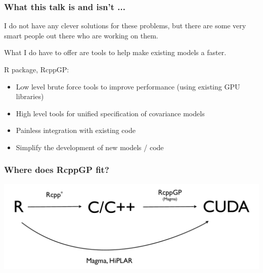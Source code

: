 \documentclass[slidestop,mathserif]{beamer}
\begin{document}
\begin{frame}
\frametitle{What this talk is and isn't ...}

I do not have any clever solutions for these problems, but there are some very smart people out there who are working on them.

\pause\vspace{6mm}

What I do have to offer are tools to help make existing models a faster. 

\vspace{5mm}

R package, RcppGP:

\begin{itemize}
\item Low level brute force tools to improve performance (using existing GPU libraries)
\vspace{2mm}
\item High level tools for unified specification of covariance models
\vspace{2mm}
\item Painless integration with existing code
\vspace{2mm}
\item Simplify the development of new models / code
\end{itemize}

\end{frame}


\begin{frame}
\frametitle{Where does RcppGP fit?}

\vfill

\begin{center}
\includegraphics[width=\textwidth]{figs/diagram.pdf}
\end{center}

\vfill

\end{frame}

\end{document}
